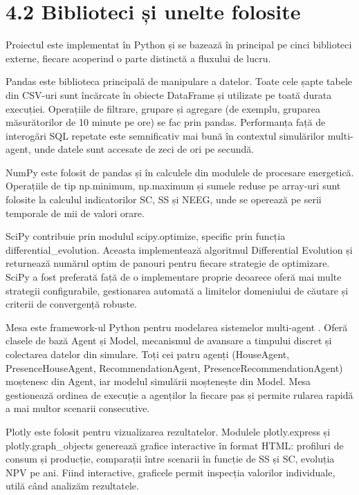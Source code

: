 \documentclass[12pt,a4paper]{report}
\begin{document}
\section*{4.2 Biblioteci și unelte folosite}

Proiectul este implementat în Python și se bazează în principal pe cinci biblioteci externe, fiecare acoperind o parte distinctă a fluxului de lucru.

Pandas este biblioteca principală de manipulare a datelor. Toate cele șapte tabele din CSV-uri sunt încărcate în obiecte DataFrame și utilizate pe toată durata execuției. Operațiile de filtrare, grupare și agregare (de exemplu, gruparea măsurătorilor de 10 minute pe ore) se fac prin pandas. Performanța față de interogări SQL repetate este semnificativ mai bună în contextul simulărilor multi-agent, unde datele sunt accesate de zeci de ori pe secundă.

NumPy este folosit de pandas și în calculele din modulele de procesare energetică. Operațiile de tip np.minimum, np.maximum și sumele reduse pe array-uri sunt folosite la calculul indicatorilor SC, SS și NEEG, unde se operează pe serii temporale de mii de valori orare.

SciPy contribuie prin modulul scipy.optimize, specific prin funcția differential\allowbreak\_evolution. Aceasta implementează algoritmul Differential Evolution și returnează numărul optim de panouri pentru fiecare strategie de optimizare. SciPy a fost preferată față de o implementare proprie deoarece oferă mai multe strategii configurabile, gestionarea automată a limitelor domeniului de căutare și criterii de convergență robuste.

Mesa este framework-ul Python pentru modelarea sistemelor multi-agent \cite{kazil2020mesa}. Oferă clasele de bază Agent și Model, mecanismul de avansare a timpului discret și colectarea datelor din simulare. Toți cei patru agenți (HouseAgent, PresenceHouseAgent, RecommendationAgent, PresenceRecommendationAgent) moștenesc din Agent, iar modelul simulării moștenește din Model. Mesa gestionează ordinea de execuție a agenților la fiecare pas și permite rularea rapidă a mai multor scenarii consecutive.

Plotly este folosit pentru vizualizarea rezultatelor. Modulele plotly.express și plotly.graph\_objects generează grafice interactive în format HTML: profiluri de consum și producție, comparații între scenarii în funcție de SS și SC, evoluția NPV pe ani. Fiind interactive, graficele permit inspecția valorilor individuale, utilă când analizăm rezultatele.
\end{document}
